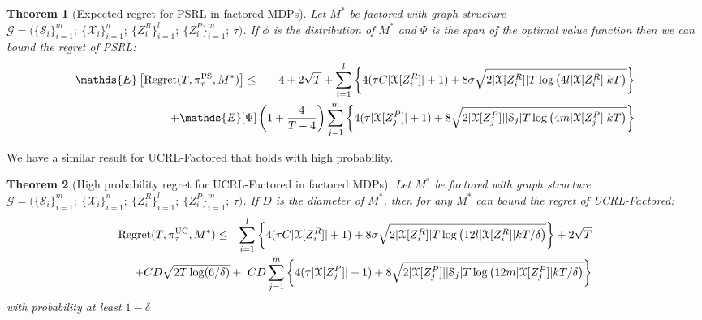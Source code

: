 \documentclass{article}
\newtheorem{theorem}{Theorem}
\newcommand{\Exp}{\mathds{E}}
\newcommand{\Xc}{\mathcal{X}}
\newcommand{\Gc}{\mathcal{G}}
\newcommand{\Sc}{\mathcal{S}}
\begin{document}
\begin{theorem}[Expected regret for PSRL in factored MDPs]
\label{thm: reg PSRL}  \hspace{0.000000001mm} \newline
Let $M^*$ be factored with graph structure $\Gc  = \big( \{ \Sc_i \}_{i=1}^m ; \  \{ \Xc_i \}_{i=1}^n ; \   \{ Z^R_i \}_{i=1}^l;\  \{ Z^P_i \}_{i=1}^m;\  \tau \big)$.
If $\phi$ is the distribution of $M^*$ and $\Psi$ is the span of the optimal value function then we can bound the regret of PSRL:
\begin{eqnarray}
	\Exp \left[\mathrm{Regret}(T, \pi^{\rm PS}_{\tau}, M^*) \right] &\le& 4 +2 \sqrt{T} +
		\sum_{i=1}^l \left\{ 4(\tau C |\Xc[Z^R_i]| + 1) + 8\sigma\sqrt{2 | \Xc[Z^R_i]| T \log\left(4 l | \Xc[Z^R_i] | k T\right)} \right\} \nonumber \\
	&& \hspace{-30mm} + \Exp[\Psi] \left( 1 + \frac{4}{T-4} \right) \sum_{j=1}^m \left\{ 4(\tau |\Xc[Z^P_j]| + 1) + 8\sqrt{2 | \Xc[Z^P_j]| |\Sc_j |   T \log\left(4 m | \Xc[Z^P_j] | k T\right)} \right\}
\end{eqnarray}
\end{theorem}

We have a similar result for UCRL-Factored that holds with high probability.
\begin{theorem}[High probability regret for UCRL-Factored in factored MDPs]
\label{thm: reg UCRL-Factored}  \hspace{0.000000001mm} \newline
Let $M^*$ be factored with graph structure $\Gc  = \big( \{ \Sc_i \}_{i=1}^m ; \  \{ \Xc_i \}_{i=1}^n ; \   \{ Z^R_i \}_{i=1}^l;\  \{ Z^P_i \}_{i=1}^m;\  \tau \big)$.
If $D$ is the diameter of $M^*$, then for any $M^*$ can bound the regret of UCRL-Factored:
\begin{eqnarray}
	\mathrm{Regret}(T, \pi^{\rm UC}_{\tau}, M^*) &\le& \sum_{i=1}^l \left\{ 4(\tau C |\Xc[Z^R_i]| + 1) + 8\sigma\sqrt{2 | \Xc[Z^R_i]| T \log\left(12 l | \Xc[Z^R_i] | k T / \delta\right)}  \right\} \nonumber + 2\sqrt{T}\\
	&& \hspace{-37mm} + CD\sqrt{2T \log(6/\delta)}  + \  CD \sum_{j=1}^m \left\{ 4(\tau |\Xc[Z^P_j]| + 1) + 8\sqrt{2 | \Xc[Z^P_j]| |\Sc_j |   T \log\left(12 m | \Xc[Z^P_j] | k T / \delta \right)} \right\}
\end{eqnarray}
\normalsize
with probability at least $1-\delta$
\end{theorem}
\end{document}
